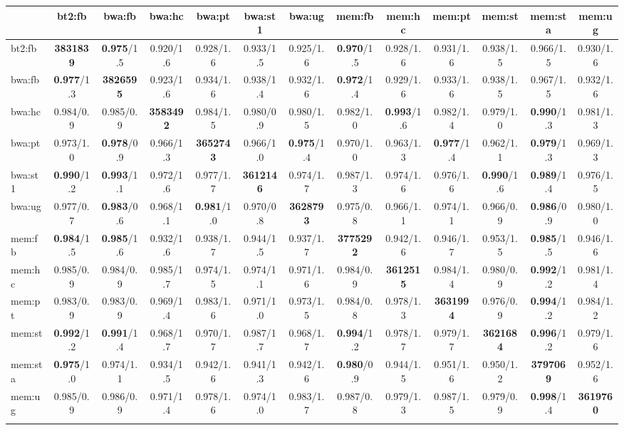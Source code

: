 \documentclass{bioinfo}
\begin{document}
\begin{table*}
{\begin{tabular*}{\textwidth}{@{\extracolsep{\fill}}lcccccccccccc}
\toprule
 & bt2:fb & bwa:fb & bwa:hc & bwa:pt & bwa:st1 & bwa:ug & mem:fb & mem:hc & mem:pt & mem:st & mem:sta & mem:ug \\
\midrule
bt2:fb & {\bf 3831839} & {\bf 0.975}/1.5 & 0.920/1.6 & 0.928/1.6 & 0.933/1.5 & 0.925/1.6 & {\bf 0.970}/1.5 & 0.928/1.6 & 0.931/1.6 & 0.938/1.5 & 0.966/1.5 & 0.930/1.6 \\
bwa:fb & {\bf 0.977}/1.3 & {\bf 3826595} & 0.923/1.6 & 0.934/1.6 & 0.938/1.4 & 0.932/1.6 & {\bf 0.972}/1.4 & 0.929/1.6 & 0.933/1.6 & 0.938/1.5 & 0.967/1.5 & 0.932/1.6 \\
bwa:hc & 0.984/0.9 & 0.985/0.9 & {\bf 3583492} & 0.984/1.5 & 0.980/0.9 & 0.980/1.5 & 0.982/1.0 & {\bf 0.993}/1.6 & 0.982/1.4 & 0.979/1.0 & {\bf 0.990}/1.3 & 0.981/1.3 \\
bwa:pt & 0.973/1.0 & {\bf 0.978}/0.9 & 0.966/1.3 & {\bf 3652743} & 0.966/1.0 & {\bf 0.975}/1.4 & 0.970/1.0 & 0.963/1.3 & {\bf 0.977}/1.4 & 0.962/1.1 & {\bf 0.979}/1.3 & 0.969/1.3 \\
bwa:st1 & {\bf 0.990}/1.2 & {\bf 0.993}/1.1 & 0.972/1.6 & 0.977/1.7 & {\bf 3612146} & 0.974/1.7 & 0.987/1.3 & 0.974/1.6 & 0.976/1.6 & {\bf 0.990}/1.6 & {\bf 0.989}/1.4 & 0.976/1.5 \\
bwa:ug & 0.977/0.7 & {\bf 0.983}/0.6 & 0.968/1.1 & {\bf 0.981}/1.0 & 0.970/0.8 & {\bf 3628793} & 0.975/0.8 & 0.966/1.1 & 0.974/1.1 & 0.966/0.9 & {\bf 0.986}/0.9 & 0.980/1.0 \\
mem:fb & {\bf 0.984}/1.5 & {\bf 0.985}/1.6 & 0.932/1.6 & 0.938/1.7 & 0.944/1.5 & 0.937/1.7 & {\bf 3775292} & 0.942/1.6 & 0.946/1.7 & 0.953/1.5 & {\bf 0.985}/1.5 & 0.946/1.6 \\
mem:hc & 0.985/0.9 & 0.984/0.9 & 0.985/1.7 & 0.974/1.5 & 0.974/1.1 & 0.971/1.6 & 0.984/0.9 & {\bf 3612515} & 0.984/1.4 & 0.980/0.9 & {\bf 0.992}/1.2 & 0.981/1.4 \\
mem:pt & 0.983/0.9 & 0.983/0.9 & 0.969/1.4 & 0.983/1.6 & 0.971/1.0 & 0.973/1.5 & 0.984/0.8 & 0.978/1.3 & {\bf 3631994} & 0.976/0.9 & {\bf 0.994}/1.2 & 0.984/1.2 \\
mem:st & {\bf 0.992}/1.2 & {\bf 0.991}/1.4 & 0.968/1.7 & 0.970/1.7 & 0.987/1.7 & 0.968/1.7 & {\bf 0.994}/1.2 & 0.978/1.7 & 0.979/1.7 & {\bf 3621684} & {\bf 0.996}/1.2 & 0.979/1.6 \\
mem:sta & {\bf 0.975}/1.0 & 0.974/1.1 & 0.934/1.5 & 0.942/1.6 & 0.941/1.3 & 0.942/1.6 & {\bf 0.980}/0.9 & 0.944/1.5 & 0.951/1.6 & 0.950/1.2 & {\bf 3797069} & 0.952/1.6 \\
mem:ug & 0.985/0.9 & 0.986/0.9 & 0.971/1.4 & 0.978/1.6 & 0.974/1.0 & 0.983/1.7 & 0.987/0.8 & 0.979/1.3 & 0.987/1.5 & 0.979/0.9 & {\bf 0.998}/1.4 & {\bf 3619760} \\
\botrule
\end{tabular*}}{}
\end{table*}
\end{document}
